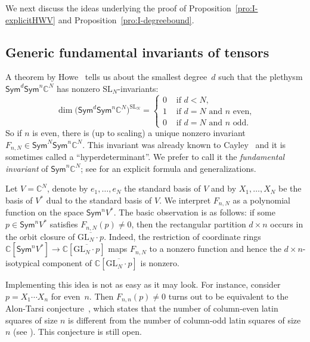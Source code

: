 \documentclass[11pt]{amsart}
\def\C{\mathbb{C}}
\def\GL{\mathrm{GL}}
\def\SL{\mathrm{SL}}
\def\dc{\mathrm{dc}}
\def\Sym{\mathsf{Sym}}
\newcommand{\ol}[1]{\overline{#1}}
\numberwithin{equation}{section}
\begin{document}

We next discuss the ideas underlying the proof of 
Proposition~\ref{pro:I-explicitHWV} and Proposition~\ref{pro:I-degreebound}. 

\subsection{Generic fundamental invariants of tensors}\label{subs:GFI}


A theorem by Howe~\cite{howe:87} tells us about the smallest degree~$d$ such that 
the plethysm $\Sym^d\Sym^n \C^N$ has nonzero $\SL_N$-invariants: 
$$
 \dim \big(\Sym^d\Sym^n \C^N\big)^{\SL_N} = 
 \left\{
 \begin{array}{ll} 
  0 & \mbox{ if $d<N$,}\\ 
  1 & \mbox{ if $d=N$ and $n$ even,}\\
  0 & \mbox{ if $d=N$ and $n$ odd.}
  \end{array}
 \right.
$$
So if $n$ is even, there is (up to scaling) a unique 
nonzero invariant $F_{n,N}\in \Sym^N\Sym^n \C^N$. 
This invariant was already known to Cayley~\cite{cayley-coll-work} 
and it is sometimes called a ``hyperdeterminant''. We prefer to call it 
the {\em fundamental invariant} of $\Sym^n \C^N$;  
see \cite[eq.~(3.8)]{buik:15} for an explicit formula and generalizations.

Let $V=\C^N$, denote by $e_1,\ldots,e_N$ the standard basis of $V$ 
and by $X_1,\ldots,X_N$ be the basis of $V^*$ dual to the standard basis of $V$.
We interpret $F_{n,N}$ as a polynomial function on the space $\Sym^n V^*$. 
The basic observation is as follows: 
if some $p\in \Sym^n V^*$ satisfies $F_{n,N}(p) \ne 0$, 
then the rectangular partition $d\times n$ 
occurs in the orbit closure of $\ol{\GL_N\cdot p}$. 
Indeed, the restriction of coordinate rings 
$\C[\Sym^n V^*] \to \C[\ol{\GL_N\cdot p}]$ 
maps $F_{n,N}$ to a nonzero function and hence 
the $d\times n$-isotypical component of $\C[\ol{\GL_N\cdot p}]$ is nonzero.

Implementing this idea is not as easy as it may look.
For instance, consider $p=X_1\cdots X_n$ for even~$n$.
Then $F_{n,n}(p) \ne 0$ turns out to be equivalent to the 
Alon-Tarsi conjecture~\cite{AT:92}, which states that 
the number of column-even latin squares of size $n$ is different from 
the number of column-odd latin squares of size $n$
(see \cite{Kum:15,buik:15}). This conjecture is still open.  
\end{document}
